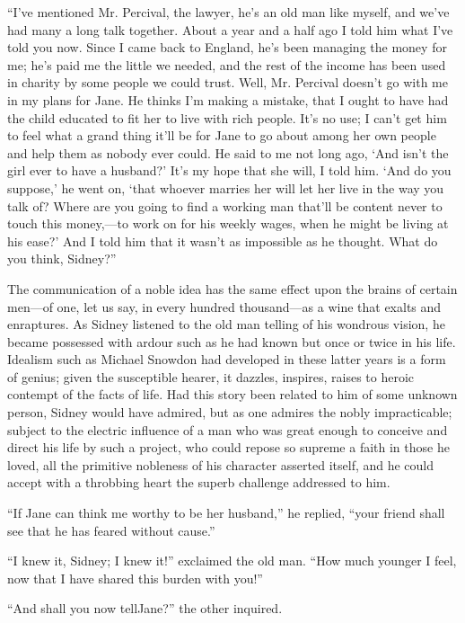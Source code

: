 ``I've mentioned Mr. Percival, the lawyer, he's an old man like myself,
and we've had many a long talk together. About a year and a half ago I
told him what I've told you now. Since I came back to England, he's been
managing the money for me; he's paid me the little we needed, and the
rest of the income has been used in charity by some people we could
trust. Well, Mr. Percival doesn't go with me in my plans for {}Jane. He
thinks I'm making a mistake, that I ought to have had the child educated
to fit her to live with rich people. It's no use; I can't get him to
feel what a grand thing it'll be for Jane to go about among her own
people and help them as nobody ever could. He said to me not long ago,
`And isn't the girl ever to have a husband?' It's my hope that she will,
I told him. `And do you suppose,' he went on, `that whoever marries her
will let her live in the way you talk of? Where are you going to find a
working man that'll be content never to touch this money,---to work on
for his weekly wages, when he might be living at his ease?' And I told
him that it wasn't as impossible as he thought. What do you think,
Sidney?''

The communication of a noble idea has the same effect upon the brains of
certain men---of one, let us say, in every hundred thousand---as a wine
that exalts and enraptures. As Sidney listened to the old man telling of
his wondrous vision, he became possessed with ardour such as he had
known {}but once or twice in his life. Idealism such as Michael Snowdon
had developed in these latter years is a form of genius; given the
susceptible hearer, it dazzles, inspires, raises to heroic contempt of
the facts of life. Had this story been related to him of some unknown
person, Sidney would have admired, but as one admires the nobly
impracticable; subject to the electric influence of a man who was great
enough to conceive and direct his life by such a project, who could
repose so supreme a faith in those he loved, all the primitive nobleness
of his character asserted itself, and he could accept with a throbbing
heart the superb challenge addressed to him.

``If Jane can think me worthy to be her husband,'' he replied, ``your
friend shall see that he has feared without cause.''

``I knew it, Sidney; I knew it!'' exclaimed the old man. ``How much
younger I feel, now that I have shared this burden with you!''

``And shall you now tellJane?'' the other inquired.

